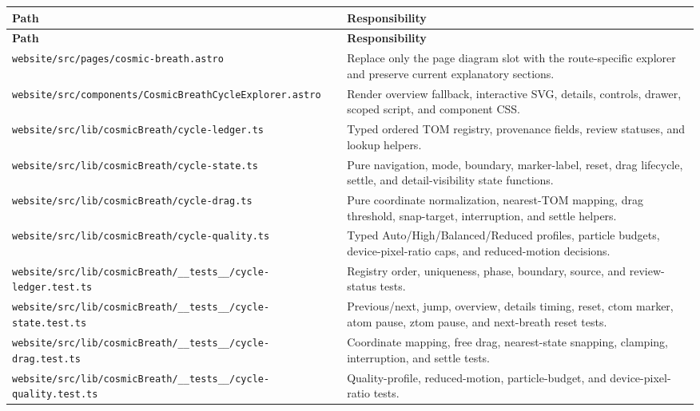 \documentclass[11pt,letterpaper]{article}
\newcommand{\filepath}[1]{\nolinkurl{#1}}
\begin{document}
\begin{longtable}{L{3.25in}L{3.05in}}
\toprule
\textbf{Path} & \textbf{Responsibility} \\
\midrule
\endfirsthead
\toprule
\textbf{Path} & \textbf{Responsibility} \\
\midrule
\endhead
\filepath{website/src/pages/cosmic-breath.astro} & Replace only the page diagram slot with the route-specific explorer and preserve current explanatory sections. \\
\filepath{website/src/components/CosmicBreathCycleExplorer.astro} & Render overview fallback, interactive SVG, details, controls, drawer, scoped script, and component CSS. \\
\filepath{website/src/lib/cosmicBreath/cycle-ledger.ts} & Typed ordered TOM registry, provenance fields, review statuses, and lookup helpers. \\
\filepath{website/src/lib/cosmicBreath/cycle-state.ts} & Pure navigation, mode, boundary, marker-label, reset, drag lifecycle, settle, and detail-visibility state functions. \\
\filepath{website/src/lib/cosmicBreath/cycle-drag.ts} & Pure coordinate normalization, nearest-TOM mapping, drag threshold, snap-target, interruption, and settle helpers. \\
\filepath{website/src/lib/cosmicBreath/cycle-quality.ts} & Typed Auto/High/Balanced/Reduced profiles, particle budgets, device-pixel-ratio caps, and reduced-motion decisions. \\
\filepath{website/src/lib/cosmicBreath/__tests__/cycle-ledger.test.ts} & Registry order, uniqueness, phase, boundary, source, and review-status tests. \\
\filepath{website/src/lib/cosmicBreath/__tests__/cycle-state.test.ts} & Previous/next, jump, overview, details timing, reset, ctom marker, atom pause, ztom pause, and next-breath reset tests. \\
\filepath{website/src/lib/cosmicBreath/__tests__/cycle-drag.test.ts} & Coordinate mapping, free drag, nearest-state snapping, clamping, interruption, and settle tests. \\
\filepath{website/src/lib/cosmicBreath/__tests__/cycle-quality.test.ts} & Quality-profile, reduced-motion, particle-budget, and device-pixel-ratio tests. \\
\bottomrule
\end{longtable}
\end{document}
